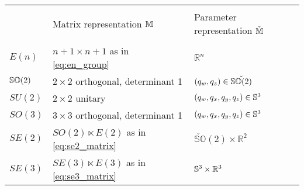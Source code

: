 \begin{tabular}{lll}
  \toprule                                                                                                   \\
          & Matrix representation $\mathbb{M}$                       & Parameter representation $\check{\mathbb{M}}$                \\
  \midrule                                                                                                   \\
  $E(n)$  & $n+1 \times n+1$ as in \eqref{eq:en_group}       & $\mathbb{R}^n$                                \\
  ${\mathbb{SO}(2)}$ & $2 \times 2$ orthogonal, determinant 1           & $(q_w, q_z) \in \check {{\mathbb{SO}(2)}}$              \\
  $SU(2)$ & $2 \times 2$ unitary                             & $(q_w, q_x, q_y, q_z) \in {\mathbb{S}^3}$            \\
  $SO(3)$ & $3 \times 3$ orthogonal, determinant 1           & $(q_w, q_x, q_y, q_z) \in {\mathbb{S}^3}$            \\
  $SE(2)$ & $SO(2) \ltimes E(2)$ as in \eqref{eq:se2_matrix} & $\check {\mathbb{SO}}(2) \times \mathbb{R}^2$ \\
  $SE(3)$ & $SE(3) \ltimes E(3)$ as in \eqref{eq:se3_matrix} & ${\mathbb{S}^3} \times \mathbb{R}^3$                 \\
  \bottomrule
\end{tabular}
